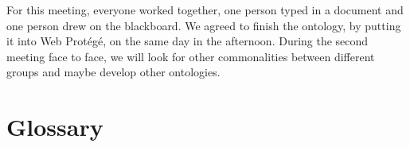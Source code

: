 For this meeting, everyone worked together, one person typed in a document and one person drew on the blackboard. We agreed to finish the ontology, by putting it into Web Protégé, on the same day in the afternoon. During the second meeting face to face, we will look for other commonalities between different groups and maybe develop other ontologies.

\section{Glossary}

